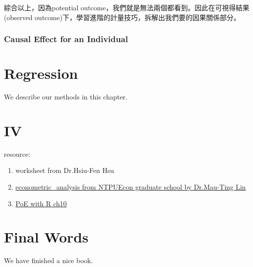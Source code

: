 \documentclass[]{book}
\begin{document}
綜合以上，因為potential outcome，我們就是無法兩個都看到。因此在可視得結果(observed outcome)下，學習進階的計量技巧，拆解出我們要的因果關係部分。

\hypertarget{causal-effect-for-an-individual}{%
\subsection{Causal Effect for an Individual}\label{causal-effect-for-an-individual}}

\hypertarget{regression}{%
\chapter{Regression}\label{regression}}

We describe our methods in this chapter.

\hypertarget{iv}{%
\chapter{IV}\label{iv}}

resource:

\begin{enumerate}
\def\labelenumi{\arabic{enumi}.}
\item
  worksheet from Dr.Hsiu-Fen Hsu
\item
  \href{https://bookdown.org/tpemartin/econometric_analysis/}{econometric\_analysis from NTPUEcon graduate school by Dr.Mau-Ting Lin}
\item
  \href{https://bookdown.org/ccolonescu/RPoE4/random-regressors.html}{PoE with R ch10}
\end{enumerate}

\hypertarget{final-words}{%
\chapter{Final Words}\label{final-words}}

We have finished a nice book.


\end{document}
